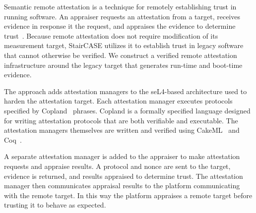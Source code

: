 Semantic remote attestation is a technique for remotely establishing
trust in running software.  An appraiser requests an attestation from
a target, receives evidence in response it the request, and appraises
the evidence to determine
trust~\cite{Haldar:04:Semantic-Remote,Coker::Principles-of-R}. Because
remote attestation does not require modification of its measurement
target, StairCASE utilizes it to establish trust in legacy software
that cannot otherwise be verified.  We construct a verified remote
attestation infrastructure around the legacy target that generates
run-time and boot-time evidence.

The approach adds attestation managers to the seL4-based architecture
used to harden the attestation target.  Each attestation manager
executes protocols specified by Copland~\cite{Ramsdell:2019aa}
phrases.  Copland is a formally specified language designed for
writing attestation protocols that are both verifiable and executable.
The attestation managers themselves are written and verified using
CakeML~\cite{Kumar:2014:CVI:2535838.2535841} and
Coq~\cite{Bertot:2013aa}.

A separate attestation manager is added to the appraiser to make
attestation requests and appraise results.  A protocol and nonce are
sent to the target, evidence is returned, and results appraised to
determine trust.  The attestation manager then communicates appraisal
results to the platform communicating with the remote target.  In this
way the platform appraises a remote target before trusting it to
behave as expected.

